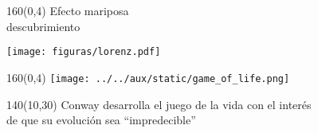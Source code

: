\documentclass[shownotes,aspectratio=169]{beamer}
\begin{document}
\begin{frame}[plain]
 \begin{textblock}{160}(0,4)
 \centering \LARGE
 Efecto mariposa \\  \Large descubrimiento
\end{textblock}
\vspace{1cm}
% 

\centering
  \texttt{[image: figuras/lorenz.pdf]}

\end{frame}

\begin{frame}[plain]
 \begin{textblock}{160}(0,4)
 \centering \LARGE
  \texttt{[image: ../../aux/static/game\_of\_life.png]}
\end{textblock}


 \begin{textblock}{140}(10,30)
 \centering
Conway desarrolla el juego de la vida con el interés \\ de que su evolución sea ``impredecible'' 
 \end{textblock}


\end{frame}
\end{document}
